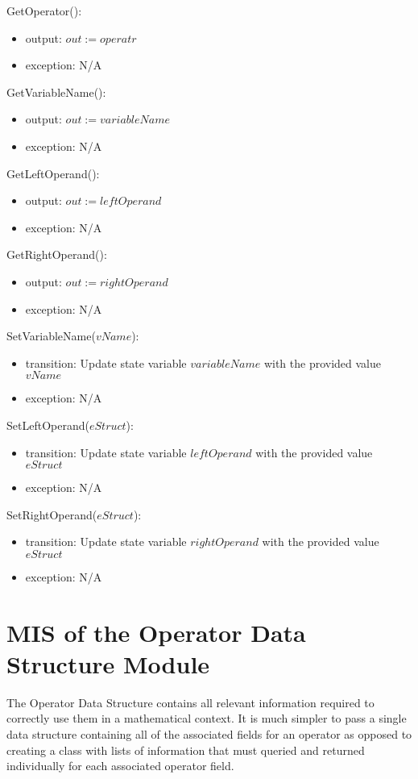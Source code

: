 \documentclass[12pt, titlepage]{article}
\begin{document}
\noindent GetOperator():
\begin{itemize}
	\item output: $out := operatr$
	\item exception: N/A
\end{itemize}

\noindent GetVariableName():
\begin{itemize}
	\item output: $out := variableName$
	\item exception: N/A
\end{itemize}

\noindent GetLeftOperand():
\begin{itemize}
	\item output: $out := leftOperand$
	\item exception: N/A
\end{itemize}

\noindent GetRightOperand():
\begin{itemize}
	\item output: $out := rightOperand$
	\item exception: N/A
\end{itemize}

\noindent SetVariableName($vName$):
\begin{itemize}
	\item transition: Update state variable $variableName$ with the provided 
	value $vName$
	\item exception: N/A
\end{itemize}

\noindent SetLeftOperand($eStruct$):
\begin{itemize}
	\item transition: Update state variable $leftOperand$ with the provided 
	value $eStruct$
	\item exception: N/A
\end{itemize}

\noindent SetRightOperand($eStruct$):
\begin{itemize}
	\item transition: Update state variable $rightOperand$ with the provided 
	value $eStruct$
	\item exception: N/A
\end{itemize}

\newpage

\section{MIS of the Operator Data Structure Module} 
\label{Module_operatordatastructure}
The Operator Data Structure contains all relevant information required to 
correctly use them in a mathematical context. It is much simpler to pass a 
single data structure containing all of the associated fields for an operator 
as opposed to creating a class with lists of information that must queried and 
returned individually for each associated operator field.
\end{document}
